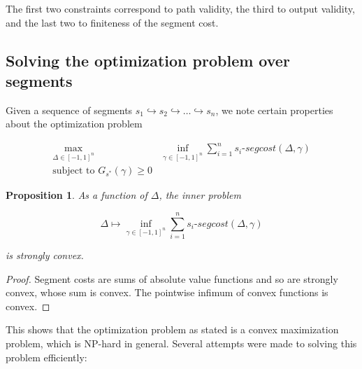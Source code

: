 \documentclass{article}
\newtheorem{proposition}{Proposition}[section]
\newcommand{\1}{\langle 1 \rangle}
\newcommand{\2}{\langle 2 \rangle}
\begin{document}
The first two constraints correspond to path validity, the third to output validity, and the last two to finiteness of the segment cost.

\subsection{Solving the optimization problem over segments}

Given a sequence of segments $s_1 \hookrightarrow s_2 \hookrightarrow \dots \hookrightarrow s_n$, we note certain properties about the optimization problem

\begin{align*}
    \max_{\Delta \in [-1, 1]^n} &\inf_{\gamma \in [-1, 1]^n} \sum_{i = 1}^n s_i\text{-}segcost(\Delta, \gamma) \\ 
    \text{subject to } G_{s^*}(\gamma) \geq 0
\end{align*}

\begin{proposition}
    As a function of $\Delta$, the inner problem

    \[\Delta \mapsto \inf_{\gamma \in [-1, 1]^n} \sum_{i = 1}^n s_i\text{-}segcost(\Delta, \gamma) \]

    is strongly convex.
\end{proposition}

\begin{proof}
    Segment costs are sums of absolute value functions and so are strongly convex, whose sum is convex. The pointwise infimum of convex functions is convex.
\end{proof}

This shows that the optimization problem as stated is a convex maximization problem, which is NP-hard in general. Several attempts were made to solving this problem efficiently: 
\end{document}
